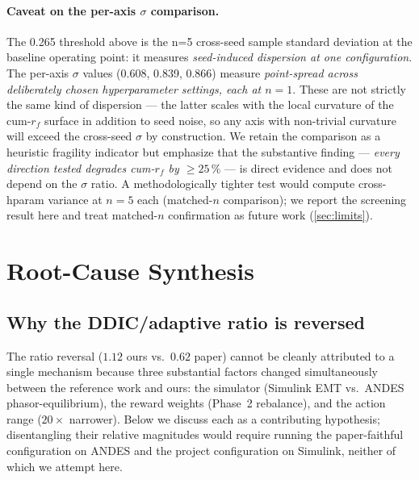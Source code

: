 \documentclass[journal,onecolumn,11pt]{IEEEtran}
\begin{document}
\paragraph{Caveat on the per-axis $\sigma$ comparison.} The 0.265
threshold above is the n=5 cross-seed sample standard deviation at
the baseline operating point: it measures \emph{seed-induced
dispersion at one configuration}. The per-axis $\sigma$ values
(0.608, 0.839, 0.866) measure \emph{point-spread across deliberately
chosen hyperparameter settings, each at $n = 1$}. These are not
strictly the same kind of dispersion --- the latter scales with the
local curvature of the cum-$r_f$ surface in addition to seed noise,
so any axis with non-trivial curvature will exceed the cross-seed
$\sigma$ by construction. We retain the comparison as a heuristic
fragility indicator but emphasize that the substantive finding ---
\emph{every direction tested degrades cum-$r_f$ by $\geq 25\,\%$} ---
is direct evidence and does not depend on the $\sigma$ ratio. A
methodologically tighter test would compute cross-hparam variance at
$n = 5$ each (matched-$n$ comparison); we report the screening
result here and treat matched-$n$ confirmation as future work
(\cref{sec:limits}).

\section{Root-Cause Synthesis}\label{sec:rootcause}

\subsection{Why the DDIC/adaptive ratio is reversed}

The ratio reversal ($1.12$ ours vs.\ $0.62$ paper) cannot be cleanly
attributed to a single mechanism because three substantial factors
changed simultaneously between the reference work and ours: the
simulator (Simulink EMT vs.\ ANDES phasor-equilibrium), the reward
weights (Phase~2 rebalance), and the action range ($20\times$
narrower). Below we discuss each as a contributing hypothesis;
disentangling their relative magnitudes would require running the
paper-faithful configuration on ANDES and the project configuration
on Simulink, neither of which we attempt here.
\end{document}
